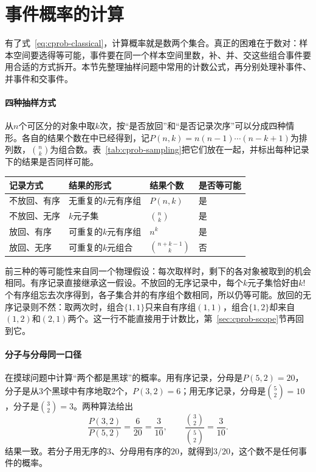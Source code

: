 \section{事件概率的计算}
\label{sec:cprob-computing}

有了式~\eqref{eq:cprob-classical}，计算概率就是数两个集合。真正的困难在于数对：样本空间要选得等可能，事件要在同一个样本空间里数，补、并、交这些组合事件要用合适的方式拆开。本节先整理抽样问题中常用的计数公式，再分别处理补事件、并事件和交事件。

\paragraph{四种抽样方式}
从$n$个可区分的对象中取$k$次，按“是否放回”和“是否记录次序”可以分成四种情形。各自的结果个数在中已经得到，记$P(n,k)=n(n-1)\cdots(n-k+1)$为排列数，$\binom nk$为组合数。表~\ref{tab:cprob-sampling}把它们放在一起，并标出每种记录下的结果是否同样可能。

\begin{BookInlineTable}
  \centering
  \caption{从$n$个对象中取$k$次的四种记录方式}
  \label{tab:cprob-sampling}
  \begin{tabular}{llll}
    \toprule
    记录方式 & 结果的形式 & 结果个数 & 是否等可能 \\
    \midrule
    不放回、有序 & 无重复的$k$元有序组 & $P(n,k)$ & 是 \\
    不放回、无序 & $k$元子集 & $\binom nk$ & 是 \\
    放回、有序 & 可重复的$k$元有序组 & $n^{k}$ & 是 \\
    放回、无序 & 可重复的$k$元组合 & $\binom{n+k-1}{k}$ & 否 \\
    \bottomrule
  \end{tabular}
\end{BookInlineTable}

前三种的等可能性来自同一个物理假设：每次取样时，剩下的各对象被取到的机会相同。有序记录直接继承这一假设。不放回的无序记录中，每个$k$元子集恰好由$k!$个有序组忘去次序得到，各子集合并的有序组个数相同，所以仍等可能。放回的无序记录则不然：取两次时，组合$\{1,1\}$只来自有序组$(1,1)$，组合$\{1,2\}$却来自$(1,2)$和$(2,1)$两个。这一行不能直接用于计数比，第~\ref{sec:cprob-scope}节再回到它。

\paragraph{分子与分母同一口径}
在摸球问题中计算“两个都是黑球”的概率。用有序记录，分母是$P(5,2)=20$，分子是从$3$个黑球中有序地取$2$个，$P(3,2)=6$；用无序记录，分母是$\binom52=10$，分子是$\binom32=3$。两种算法给出
\[
 \frac{P(3,2)}{P(5,2)}=\frac{6}{20}=\frac{3}{10},\qquad
 \frac{\binom32}{\binom52}=\frac{3}{10}.
\]
结果一致。若分子用无序的$3$、分母用有序的$20$，就得到$3/20$，这个数不是任何事件的概率。

